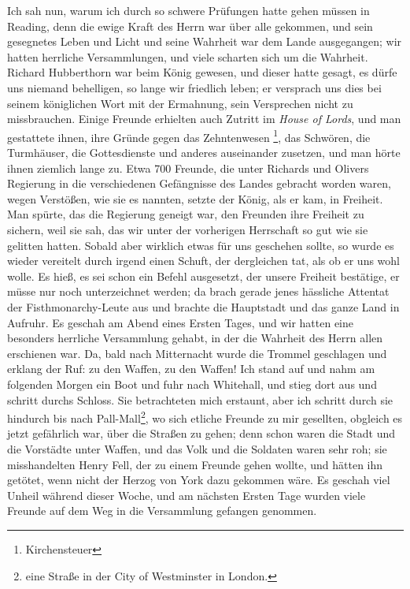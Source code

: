 Ich sah nun, warum ich durch so schwere Prüfungen hatte
gehen müssen in Reading, denn die ewige Kraft des Herrn war
über alle gekommen, und sein gesegnetes Leben und Licht und
seine Wahrheit war dem Lande ausgegangen; wir hatten herrliche 
Versammlungen, und viele scharten sich um die Wahrheit.
Richard Hubberthorn war beim König gewesen, und dieser hatte
gesagt, es dürfe uns niemand behelligen, so lange wir friedlich
leben; er versprach uns dies bei seinem königlichen Wort mit der
Ermahnung, sein Versprechen nicht zu missbrauchen. Einige
Freunde erhielten auch Zutritt im \textit{House of Lords}, und man
gestattete ihnen, ihre Gründe gegen das Zehntenwesen \footnote{Kirchensteuer}, 
das Schwören, die Turmhäuser, die Gottesdienste und anderes 
auseinander zusetzen, und man hörte ihnen ziemlich lange zu. Etwa 700 Freunde,
die unter Richards und Olivers Regierung in die verschiedenen
Gefängnisse des Landes gebracht worden waren, wegen Verstößen,
wie sie es nannten, setzte der König, als er kam, in Freiheit.
Man spürte, das die Regierung geneigt war, den Freunden ihre
Freiheit zu sichern, weil sie sah, das wir unter der vorherigen
Herrschaft so gut wie sie gelitten hatten. Sobald aber wirklich
etwas für uns geschehen sollte, so wurde es wieder vereitelt durch
irgend einen Schuft, der dergleichen tat, als ob er uns wohl
wolle. Es hieß, es sei schon ein Befehl ausgesetzt, der unsere
Freiheit bestätige, er müsse nur noch unterzeichnet werden; da
brach gerade jenes hässliche Attentat der Fisthmonarchy-Leute
aus und brachte die Hauptstadt und das ganze Land in Aufruhr.
Es geschah am Abend eines Ersten Tages, und wir hatten eine
besonders herrliche Versammlung gehabt, in der die Wahrheit
des Herrn allen erschienen war. Da, bald nach Mitternacht wurde
die Trommel geschlagen und erklang der Ruf: \glqq zu den Waffen,
zu den Waffen!\grqq{} Ich stand auf und nahm am folgenden Morgen
ein Boot und fuhr nach Whitehall, und stieg dort aus und schritt
durchs Schloss. Sie betrachteten mich erstaunt, aber ich schritt
durch sie hindurch bis nach Pall-Mall\footnote{eine Straße in der 
City of Westminster in London.}, wo sich etliche Freunde
zu mir gesellten, obgleich es jetzt gefährlich war, über die Straßen
zu gehen; denn schon waren die Stadt und die Vorstädte unter
Waffen, und das Volk und die Soldaten waren sehr roh; sie 
misshandelten Henry Fell, der zu einem Freunde gehen wollte, und
hätten ihn getötet, wenn nicht der Herzog von York dazu gekommen
wäre. Es geschah viel Unheil während dieser Woche, und am
nächsten Ersten Tage wurden viele Freunde auf dem Weg in die
Versammlung gefangen genommen.

